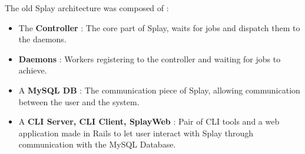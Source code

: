\documentclass{eplmastersthesis}
\begin{document}
        The old Splay architecture was composed of :

        \begin{itemize}
          \item The \textbf{Controller} : The core part of Splay, waits for jobs
          and dispatch them to the daemons.
          \item \textbf{Daemons} : Workers registering to the controller and waiting
          for jobs to achieve.
          \item A \textbf{MySQL DB} : The communication piece of Splay, allowing
          communication between the user and the system.
          \item A \textbf{CLI Server, CLI Client, SplayWeb} : Pair of CLI tools
          and a web application made in Rails to let user interact with
          Splay through communication with the MySQL Database.
        \end{itemize}
\end{document}
